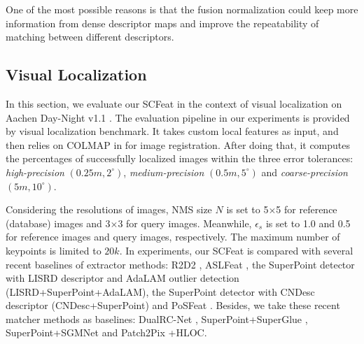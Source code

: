 \documentclass[journal]{IEEEtran}
\begin{document}
One of the most possible reasons is that the fusion normalization could keep more information from dense descriptor maps and improve the repeatability of matching between different descriptors.

\subsection{Visual Localization} \label{vl}

















In this section, we evaluate our SCFeat in the context of visual localization on Aachen Day-Night v1.1 \cite{aachen}. The evaluation pipeline in our experiments is provided by visual localization benchmark. It takes custom local features as input, and then relies on COLMAP in \cite{schoenberger2016sfm,schoenberger2016mvs} for image registration. After doing that, it computes the percentages of successfully localized images within the three error tolerances: \emph{high-precision} $(0.25m, 2^{\circ})$, \emph{medium-precision} $(0.5m, 5^{\circ})$ and \emph{coarse-precision} $(5m, 10^{\circ})$.

Considering the resolutions of images, NMS size $N$ is set to 5$\times$5 for reference (database) images and 3$\times$3 for query images. Meanwhile, $\epsilon_{s}$ is set to 1.0 and 0.5 for reference images and query images, respectively. The maximum number of keypoints is limited to $20k$. 
In experiments, our SCFeat is compared with several recent baselines of extractor methods: R2D2 \cite{R2D2}, ASLFeat \cite{aslfeat}, the SuperPoint detector \cite{SuperPoint} with LISRD descriptor \cite{LISRD} and AdaLAM outlier detection \cite{cavalli2020handcrafted} (LISRD+SuperPoint+AdaLAM), the SuperPoint detector with CNDesc descriptor \cite{cndesc} (CNDesc+SuperPoint) and PoSFeat \cite{li2022decoupling}. Besides, we take these recent matcher methods as baselines: DualRC-Net \cite{DualRC-Net}, SuperPoint+SuperGlue \cite{SuperGlue}, SuperPoint+SGMNet \cite{sgmnet} and Patch2Pix \cite{Patch2Pix}+HLOC\cite{HLOC}.
\end{document}
